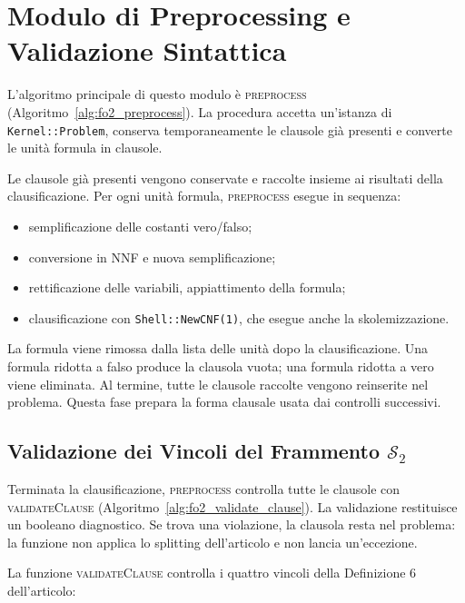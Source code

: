 \section{Modulo di Preprocessing e Validazione Sintattica}
\label{sec:modulo_preprocessing}


L'algoritmo principale di questo modulo è \textsc{preprocess} (Algoritmo~\ref{alg:fo2_preprocess}). La procedura accetta un'istanza di \texttt{Kernel::Problem}, conserva temporaneamente le clausole già presenti e converte le unità formula in clausole.

Le clausole già presenti vengono conservate e raccolte insieme ai risultati della clausificazione. Per ogni unità formula, \textsc{preprocess} esegue in sequenza:
\begin{itemize}
    \item semplificazione delle costanti vero/falso;
    \item conversione in NNF e nuova semplificazione;
    \item rettificazione delle variabili, appiattimento della formula;
    \item clausificazione con \texttt{Shell::NewCNF(1)}, che esegue anche la skolemizzazione.
\end{itemize}

La formula viene rimossa dalla lista delle unità dopo la clausificazione. Una formula ridotta a falso produce la clausola vuota; una formula ridotta a vero viene eliminata. Al termine, tutte le clausole raccolte vengono reinserite nel problema. Questa fase prepara la forma clausale usata dai controlli successivi.

\subsection{Validazione dei Vincoli del Frammento $\mathcal{S}_2$}

Terminata la clausificazione, \textsc{preprocess} controlla tutte le clausole con \textsc{validateClause} (Algoritmo~\ref{alg:fo2_validate_clause}). La validazione restituisce un booleano diagnostico. Se trova una violazione, la clausola resta nel problema: la funzione non applica lo splitting dell'articolo e non lancia un'eccezione.

La funzione \textsc{validateClause} controlla i quattro vincoli della Definizione 6 dell'articolo:

